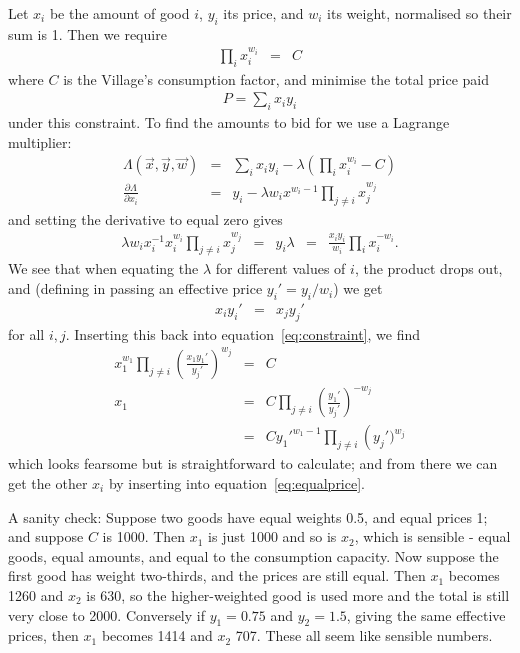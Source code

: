 Let $x_i$ be the amount of good $i$, $y_i$ its price, and $w_i$ its
weight, normalised so their sum is 1. Then we require
\begin{eqnarray}
\label{eq:constraint}
\prod\limits_i x_i^{w_i} &=& C
\end{eqnarray}
where $C$ is the Village's consumption factor, and minimise the total
price paid
\begin{eqnarray*}
P = \sum\limits_i x_iy_i
\end{eqnarray*}
under this constraint. To find the amounts to bid for we use a
Lagrange multiplier:
\begin{eqnarray*}
\Lambda(\vec x, \vec y, \vec w) &=& \sum\limits_i x_iy_i -
\lambda\left(\prod\limits_i x_i^{w_i} - C\right)\\
\frac{\partial\Lambda}{\partial x_i} &=& y_i - \lambda w_ix^{w_i-1}\prod\limits_{j\ne i} x_j^{w_j}
\end{eqnarray*}
and setting the derivative to equal zero gives
\begin{eqnarray*}
\lambda w_ix_i^{-1}x_i^{w_i}\prod\limits_{j\ne i} x_j^{w_j} &=& y_i
\lambda &=& \frac{x_iy_i}{w_i}\prod\limits_i x_i^{-w_i}.
\end{eqnarray*}
We see that when equating the $\lambda$ for different values of $i$,
the product drops out, and (defining in passing an effective price
$y_i'=y_i/w_i$) we get
\begin{eqnarray}
\label{eq:equalprice}
x_iy_i' &=& x_jy_j'
\end{eqnarray}
for all $i, j$. Inserting this back into equation~\ref{eq:constraint},
we find
\begin{eqnarray}
x_1^{w_1}\prod\limits_{j\ne i} \left(\frac{x_1y_1'}{y_j'}\right)^{w_j} &=& C\\
x_1 &=& C \prod\limits_{j\ne i}\left(\frac{y_1'}{y_j'}\right)^{-w_j} \\
\label{eq:amount}
    &=& Cy_1'^{w_1-1} \prod\limits_{j\ne i}\left(y_j')^{w_j}
\end{eqnarray}
which looks fearsome but is straightforward to calculate; and from
there we can get the other $x_i$ by inserting into
equation~\ref{eq:equalprice}.

A sanity check: Suppose two goods have equal weights 0.5, and equal
prices 1; and suppose $C$ is 1000. Then $x_1$ is just 1000 and so is
$x_2$, which is sensible - equal goods, equal amounts, and equal to
the consumption capacity. Now suppose the first good has weight
two-thirds, and the prices are still equal. Then $x_1$ becomes 1260
and $x_2$ is 630, so the higher-weighted good is used more and the
total is still very close to 2000. Conversely if $y_1=0.75$ and
$y_2=1.5$, giving the same effective prices, then $x_1$ becomes 1414
and $x_2$ 707. These all seem like sensible numbers.

